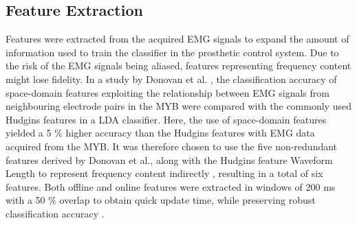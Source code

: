 \subsection{Feature Extraction}
Features were extracted from the acquired EMG signals to expand the amount of information used to train the classifier in the prosthetic control system. Due to the risk of the EMG signals being aliased, features representing frequency content might lose fidelity. In a study by Donovan et al. \cite{Donovan2017}, the classification accuracy of space-domain features exploiting the relationship between EMG signals from neighbouring electrode pairs in the MYB were compared with the commonly used Hudgins features in a LDA classifier. Here, the use of space-domain features yielded a 5 $\%$ higher accuracy than the Hudgins features with EMG data acquired from the MYB. It was therefore chosen to use the five non-redundant features derived by Donovan et al., along with the Hudgins feature Waveform Length to represent frequency content indirectly \cite{Hudgins1993}, resulting in a total of six features. Both offline and online features were extracted in windows of 200 ms with a 50 $\%$ overlap to obtain quick update time, while preserving robust classification accuracy \cite{Menon2017}. 
